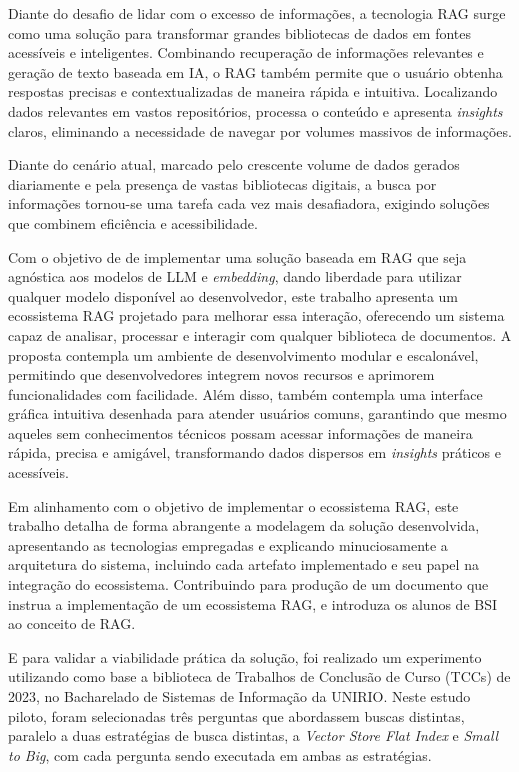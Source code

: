 \documentclass[a4paper, 12pt]{article}
\begin{document}
    Diante do desafio de lidar com o excesso de informações, a tecnologia RAG surge como uma solução para transformar grandes bibliotecas de dados em fontes acessíveis e inteligentes. Combinando recuperação de informações relevantes e geração de texto baseada em IA, o RAG também permite que o usuário obtenha respostas precisas e contextualizadas de maneira rápida e intuitiva. Localizando dados relevantes em vastos repositórios, processa o conteúdo e apresenta \textit{insights} claros, eliminando a necessidade de navegar por volumes massivos de informações.

    Diante do cenário atual, marcado pelo crescente volume de dados gerados diariamente e pela presença de vastas bibliotecas digitais, a busca por informações tornou-se uma tarefa cada vez mais desafiadora, exigindo soluções que combinem eficiência e acessibilidade. 
    
    Com o objetivo de de implementar uma solução baseada em RAG que seja agnóstica aos modelos de LLM e \textit{embedding}, dando liberdade para utilizar qualquer modelo disponível ao desenvolvedor, este trabalho apresenta um ecossistema RAG projetado para melhorar essa interação, oferecendo um sistema capaz de analisar, processar e interagir com qualquer biblioteca de documentos. A proposta contempla um ambiente de desenvolvimento modular e escalonável, permitindo que desenvolvedores integrem novos recursos e aprimorem funcionalidades com facilidade. Além disso, também contempla uma interface gráfica intuitiva desenhada para atender usuários comuns, garantindo que mesmo aqueles sem conhecimentos técnicos possam acessar informações de maneira rápida, precisa e amigável, transformando dados dispersos em \textit{insights} práticos e acessíveis. 

    Em alinhamento com o objetivo de implementar o ecossistema RAG, este trabalho detalha de forma abrangente a modelagem da solução desenvolvida, apresentando as tecnologias empregadas e explicando minuciosamente a arquitetura do sistema, incluindo cada artefato implementado e seu papel na integração do ecossistema. Contribuindo para produção de um documento que instrua a implementação de um ecossistema RAG, e introduza os alunos de BSI ao conceito de RAG.
    
    E para validar a viabilidade prática da solução, foi realizado um experimento utilizando como base a biblioteca de Trabalhos de Conclusão de Curso (TCCs) de 2023, no Bacharelado de Sistemas de Informação da UNIRIO. Neste estudo piloto, foram selecionadas três perguntas que abordassem buscas distintas, paralelo a duas estratégias de busca distintas, a \textit{Vector Store Flat Index} e \textit{Small to Big}, com cada pergunta sendo executada em ambas as estratégias.
    
\end{document}
